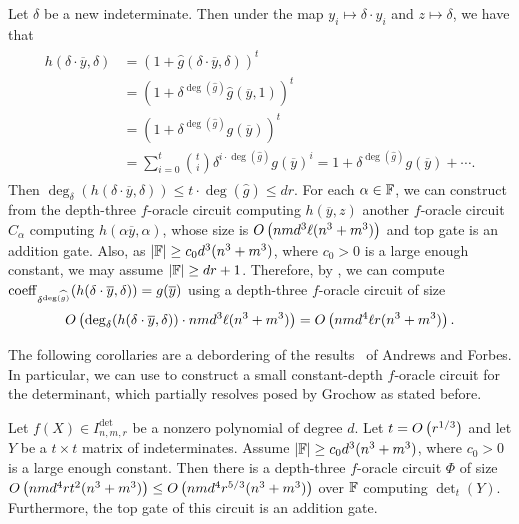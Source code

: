\documentclass[letterpaper, 11pt]{amsart}
\newif\iffull
\begin{document}
\begin{pf}
    Let $\delta$ be a new indeterminate.
    Then under the map $y_i \mapsto \delta \cdot y_i$ and $z \mapsto \delta$, we have that
    \begin{gather}
    \begin{aligned}\label{eq:det_computation_char_0}
        h(\delta \cdot \overline{y}, \delta) &=  (1 + \widehat{g}(\delta \cdot \overline{y}, \delta))^t \\
                                             &=  (1 + \delta^{\deg(\widehat{g})} \widehat{g}(\overline{y}, 1))^t \\
                                             &= (1 + \delta^{\deg(\widehat{g})} g(\overline{y}))^t \\
                                             &= \sum_{i = 0}^t \binom{t}{i} \delta^{i \cdot \deg(\widehat{g})} g(\overline{y})^i = 1 +  \delta^{\deg(\widehat{g})} g(\overline{y}) + \cdots.
    \end{aligned}
    \end{gather}
    Then $\deg_\delta(h(\delta \cdot \overline{y}, \delta)) \leq t \cdot \deg(\widehat{g}) \leq dr$.
    For each $\alpha\in\mathbb{F}$, we can construct from the depth-three $f$-oracle circuit computing $h(\overline{y},z)$ another $f$-oracle circuit $C_\alpha$ computing $h(\alpha \overline{y}, \alpha)$, whose size is $O\kern-0.0pt\left(nmd^3\ell(n^3+m^3)\right)$ and top gate is an addition gate.
    Also, as $\abs{\mathbb{F}} \geq c_0 d^3(n^3+m^3)$, where $c_0>0$ is a large enough constant, we may assume $\abs{\mathbb{F}} \geq dr+1$.
    Therefore, by , we can compute $\operatorname{coeff}_{\delta^{\deg(\widehat{g})}}(h(\delta\cdot \overline{y},\delta))=g(\overline{y})$ using a depth-three $f$-oracle circuit of size
    \[
      O\kern-0.0pt\left(\deg_\delta(h(\delta \cdot \overline{y}, \delta))\cdot nmd^3\ell(n^3+m^3)\right)=O\kern-0.0pt\left(nmd^4\ell r(n^3+m^3)\right).
    \]
\end{pf}
\fi

The following corollaries are a debordering of the results~\cite[Corollary 3.9, Corollary 3.10]{AF22} of Andrews and Forbes.
In particular, we can use  to construct a small constant-depth $f$-oracle circuit for the determinant, which partially resolves  posed by Grochow as stated before.
\begin{cor}\label{cor:det_oracle_for_det}
    Let $f(X) \in I^{\det}_{n, m, r}$ be a nonzero polynomial of degree $d$.
    Let $t=O\kern-0.0pt\left(r^{1/3}\right)$ and let $Y$ be a $t \times t$ matrix of indeterminates.
    Assume $\abs{\mathbb{F}} \geq c_0 d^3(n^3+m^3)$, where $c_0>0$ is a large enough constant.
    Then there is a depth-three $f$-oracle circuit $\Phi$ of size $O\kern-0.0pt\left(n m d^4 r t^2 (n^3+m^3)\right) \leq O\kern-0.0pt\left(n m d^4 r^{5/3} (n^3+m^3)\right)$ over $\mathbb{F}$ computing $\det_t(Y)$.
    Furthermore, the top gate of this circuit is an addition gate.
\end{cor}
\iffull
\begin{pf}
  Mahajan and Vinay~\cite[Theorem 2]{MV97} construct an algebraic branching program on $\bigO{t^3} \leq r$ vertices which computes $\det_t(Y)$.
  Then, the total number of variables in $Y$ is $t^2 = \bigO{r^{2 / 3}}$.
  The result then follows by applying \Cref{thrm:ABP_det_oracle}.
\end{pf}
\fi
\end{document}
